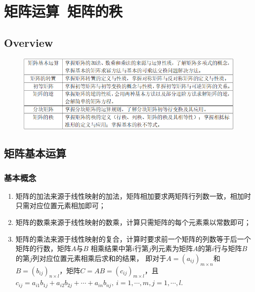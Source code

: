 \chapter{矩阵运算\ 矩阵的秩}

\section{Overview}
\begin{figure}[h]
	\centering
	\includegraphics[scale=0.58]{4.png}
\end{figure}

\section{矩阵基本运算}
\subsection{基本概念}
\begin{enumerate}
	\item 矩阵的加法来源于线性映射的加法，矩阵相加要求两矩阵行列数一致，相加时只需对应位置元素相加即可；
	\item 矩阵的数乘来源于线性映射的数乘，计算只需矩阵的每个元素乘以常数即可；
	\item 矩阵的乘法来源于线性映射的复合，计算时要求前一个矩阵的列数等于后一个矩阵的行数，矩阵$A$与$B$
	相乘结果中第$i$行第$j$列元素为矩阵$A$的第$i$行与矩阵$B$的第$j$列对应位置元素相乘后求和的结果，
	即对于$A=(a_{ij})_{m \times n}$和$B=(b_{ij})_{n \times l}$，矩阵$C=AB=(c_{ij})_{m \times l}$，且
	$c_{ij}=a_{i1}b_{1j}+a_{i2}b_{2j}+\cdots+a_{in}b_{nj},\ i=1,\cdots,m,j=1,\cdots,l$.
\end{enumerate}

